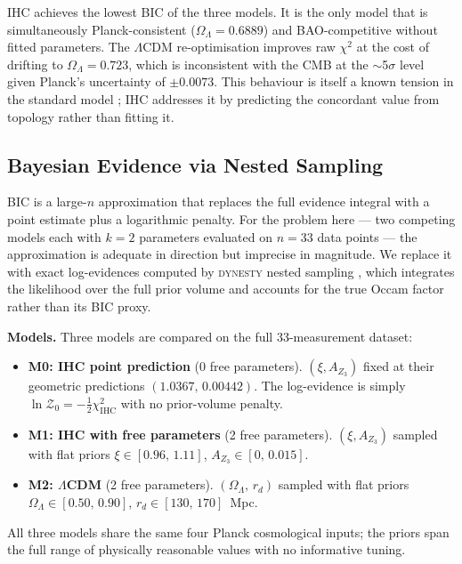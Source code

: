 \documentclass[12pt,a4paper]{article}
\begin{document}
IHC achieves the lowest BIC of the three models. It is the only model that is
simultaneously Planck-consistent ($\Omega_\Lambda = 0.6889$) and BAO-competitive
without fitted parameters. The $\Lambda$CDM re-optimisation improves raw $\chi^2$
at the cost of drifting to $\Omega_\Lambda = 0.723$, which is inconsistent with
the CMB at the $\sim$5$\sigma$ level given Planck's uncertainty of $\pm 0.0073$.
This behaviour is itself a known tension in the standard model
\citep{Planck2020,DESI2025}; IHC addresses it by predicting the concordant value
from topology rather than fitting it.

\subsection{Bayesian Evidence via Nested Sampling}
\label{sec:evidence}

BIC is a large-$n$ approximation that replaces the full evidence integral with a
point estimate plus a logarithmic penalty. For the problem here --- two competing
models each with $k = 2$ parameters evaluated on $n = 33$ data points --- the
approximation is adequate in direction but imprecise in magnitude.  We replace it
with exact log-evidences computed by \textsc{dynesty} nested sampling
\citep{dynesty2020}, which integrates the likelihood over the full prior volume and
accounts for the true Occam factor rather than its BIC proxy.

\textbf{Models.}  Three models are compared on the full 33-measurement dataset:
\begin{itemize}
  \item \textbf{M0: IHC point prediction} (0 free parameters).
        $(\xi, A_{Z_3})$ fixed at their geometric predictions $(1.0367,\,0.00442)$.
        The log-evidence is simply $\ln\mathcal{Z}_0 = -\tfrac{1}{2}\chi^2_\mathrm{IHC}$
        with no prior-volume penalty.
  \item \textbf{M1: IHC with free parameters} (2 free parameters).
        $(\xi, A_{Z_3})$ sampled with flat priors
        $\xi \in [0.96,\,1.11]$, $A_{Z_3} \in [0,\,0.015]$.
  \item \textbf{M2: $\Lambda$CDM} (2 free parameters).
        $(\Omega_\Lambda,\,r_d)$ sampled with flat priors
        $\Omega_\Lambda \in [0.50,\,0.90]$, $r_d \in [130,\,170]$~Mpc.
\end{itemize}
All three models share the same four Planck cosmological inputs; the priors span
the full range of physically reasonable values with no informative tuning.
\end{document}
